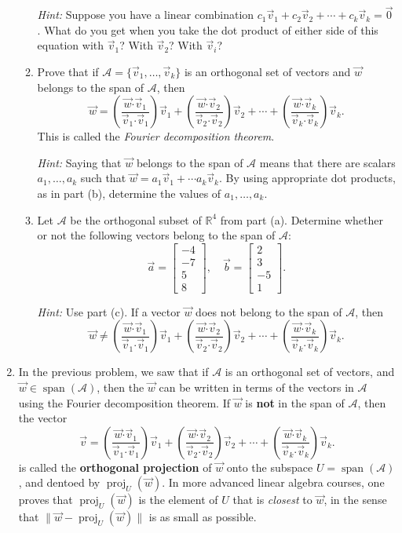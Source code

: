 \documentclass[letterpaper,12pt]{article}
\newcommand{\len}[1]{\lVert #1\rVert}
\newcommand{\R}{\mathbb{R}}
\newcommand{\dotp}{\boldsymbol{\cdot}}
\newcommand{\bbm}{\begin{bmatrix}}
\newcommand{\ebm}{\end{bmatrix}}
\DeclareMathOperator{\proj}{proj}
\begin{document}
\begin{enumerate}
\begin{enumerate}
\textit{Hint:} Suppose you have a linear combination $c_1\vec{v}_1+c_2\vec{v}_2+\cdots + c_k\vec{v}_k = \vec{0}$. What do you get when you take the dot product of either side of this equation with $\vec{v}_1$? With $\vec{v}_2$? With $\vec{v}_i$?

 \item Prove that if $\mathcal{A} = \{\vec{v}_1,\ldots, \vec{v}_k\}$ is an orthogonal set of vectors and $\vec{w}$ belongs to the span of $\mathcal{A}$, then
\[
 \vec{w} = \left(\frac{\vec{w}\dotp\vec{v}_1}{\vec{v}_1\dotp \vec{v}_1}\right)\vec{v}_1 + \left(\frac{\vec{w}\dotp\vec{v}_2}{\vec{v}_2\dotp\vec{v}_2}\right)\vec{v}_2+\cdots + \left(\frac{\vec{w}\dotp\vec{v}_k}{\vec{v}_k\dotp\vec{v}_k}\right)\vec{v}_k.
\]
This is called the \textit{Fourier decomposition theorem}.

\textit{Hint:} Saying that $\vec{w}$ belongs to the span of $\mathcal{A}$ means that there are scalars $a_1,\ldots, a_k$ such that $\vec{w} = a_1\vec{v}_1+\cdots a_k\vec{v}_k$. By using appropriate dot products, as in part (b), determine the values of $a_1,\ldots, a_k$.

 \item Let $\mathcal{A}$ be the orthogonal subset of $\R^4$ from part (a). Determine whether or not the following vectors belong to the span of $\mathcal{A}$:
\[
 \vec{a} = \bbm -4\\-7\\5\\8\ebm, \quad \vec{b} = \bbm 2\\3\\-5\\1\ebm.
\]

\textit{Hint:} Use part (c). If a vector $\vec{w}$ does not belong to the span of $\mathcal{A}$, then
\[
 \vec{w} \neq \left(\frac{\vec{w}\dotp\vec{v}_1}{\vec{v}_1\dotp \vec{v}_1}\right)\vec{v}_1 + \left(\frac{\vec{w}\dotp\vec{v}_2}{\vec{v}_2\dotp\vec{v}_2}\right)\vec{v}_2+\cdots + \left(\frac{\vec{w}\dotp\vec{v}_k}{\vec{v}_k\dotp\vec{v}_k}\right)\vec{v}_k.
\]

\end{enumerate}

\newpage

\item In the previous problem, we saw that if $\mathcal{A}$ is an orthogonal set of vectors, and $\vec{w}\in\operatorname{span}(\mathcal{A})$, then the $\vec{w}$ can be written in terms of the vectors in $\mathcal{A}$ using the Fourier decomposition theorem. If $\vec{w}$ is \textbf{not} in the span of $\mathcal{A}$, then the vector
\[
 \vec{v}=\left(\frac{\vec{w}\dotp\vec{v}_1}{\vec{v}_1\dotp \vec{v}_1}\right)\vec{v}_1 + \left(\frac{\vec{w}\dotp\vec{v}_2}{\vec{v}_2\dotp\vec{v}_2}\right)\vec{v}_2+\cdots + \left(\frac{\vec{w}\dotp\vec{v}_k}{\vec{v}_k\dotp\vec{v}_k}\right)\vec{v}_k.
\]
is called the \textbf{orthogonal projection} of $\vec{w}$ onto the subspace $U=\operatorname{span}(\mathcal{A})$, and dentoed by $\proj_U(\vec{w})$. In more advanced linear algebra courses, one proves that $\proj_U(\vec{w})$ is the element of $U$ that is \textit{closest} to $\vec{w}$, in the sense that $\len{\vec{w}-\proj_U(\vec{w})}$ is as small as possible.


\end{enumerate}
\end{document}
